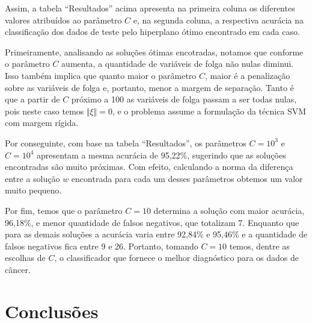 \documentclass[12pt,a4paper]{scrartcl}
\theoremstyle{definition}%
\begin{document}
Assim, a tabela ``Resultados'' acima apresenta na primeira coluna os
diferentes valores atribuídos ao parâmetro \(C\) e, na segunda coluna, a
respectiva acurácia na classificação dos dados de teste pelo hiperplano
ótimo encontrado em cada caso.

Primeiramente, analisando as soluções ótimas encotradas, notamos que
conforme o parâmetro \(C\) aumenta, a quantidade de variáveis de folga
não nulas diminui. Isso também implica que quanto maior o parâmetro
\(C\), maior é a penalização sobre as variáveis de folga e, portanto,
menor a margem de separação. Tanto é que a partir de \(C\) próximo a 100
as variáveis de folga passam a ser todas nulas, pois neste caso temos
\(\Vert \xi \Vert = 0\), e o problema assume a formulação da técnica SVM
com margem rígida.

Por conseguinte, com base na tabela ``Resultados'', os parâmetros
\(C = 10^{3}\) e \(C = 10^{4}\) apresentam a mesma acurácia de 95,22\%,
sugerindo que as soluções encontradas são muito próximas. Com efeito,
calculando a norma da diferença entre a solução \(w\) encontrada para
cada um desses parâmetros obtemos um valor muito pequeno.

Por fim, temos que o parâmetro \(C = 10\) determina a solução com maior
acurácia, 96,18\%, e menor quantidade de falsos negativos, que totalizam
7. Enquanto que para as demais soluções a acurácia varia entre 92,84\% e
95,46\% e a quantidade de falsos negativos fica entre 9 e 26. Portanto,
tomando \(C = 10\) temos, dentre as escolhas de \(C\), o classificador
que fornece o melhor diagnóstico para os dados de câncer.





\newpage
\section{Conclusões}


\newpage

\printbibliography
\end{document}
